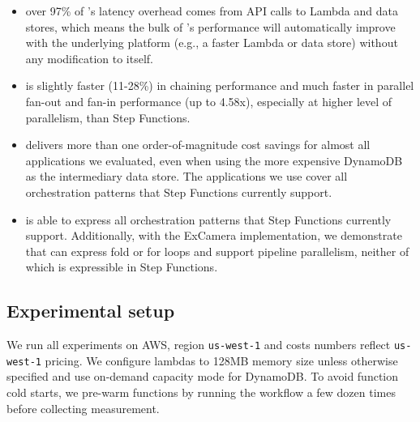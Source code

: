 \begin{itemize}

    \item over 97\% of \name{}'s latency overhead comes from API calls to
    Lambda and data stores, which means the bulk of \name{}'s performance will
    automatically improve with the underlying platform (e.g., a faster Lambda
    or data store) without any modification to \name{} itself.


    \item \name{} is slightly faster (11-28\%) in chaining performance and
    much faster in parallel fan-out and fan-in performance (up to 4.58x),
    especially at higher level of parallelism, than Step Functions.

    \item \name{} delivers more than one order-of-magnitude cost savings for
    almost all applications we evaluated, even when using the more expensive
    DynamoDB as the intermediary data store. The applications we use cover all
    orchestration patterns that Step Functions currently support.

    \item \name{} is able to express all orchestration patterns that Step
    Functions currently support. Additionally, with the ExCamera
    implementation, we demonstrate that \name{} can express fold or for loops
    and support pipeline parallelism, neither of which is expressible in Step
    Functions.

\end{itemize}


\subsection{Experimental setup}

We run all experiments on AWS, region \texttt{us-west-1} and costs numbers
reflect \texttt{us-west-1} pricing. We configure lambdas to 128MB memory size
unless otherwise specified and use on-demand capacity mode for DynamoDB. To
avoid function cold starts, we pre-warm functions by running the workflow a
few dozen times before collecting measurement.


